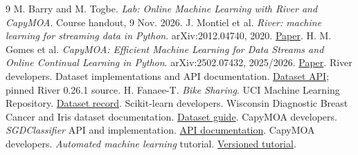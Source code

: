 \documentclass[10pt,a4paper]{article}
\begin{document}
\begin{minipage}[t]{.52\linewidth}\vspace{0pt}
\begin{thebibliography}{9}\fontsize{8.5}{10}\selectfont\setlength{\itemsep}{0pt}
 M. Barry and M. Togbe. \emph{Lab: Online Machine Learning with River and CapyMOA}. Course handout, 9 Nov. 2026.
 J. Montiel et al. \emph{River: machine learning for streaming data in Python}. arXiv:2012.04740, 2020. \href{https://arxiv.org/abs/2012.04740}{Paper}.
 H. M. Gomes et al. \emph{CapyMOA: Efficient Machine Learning for Data Streams and Online Continual Learning in Python}. arXiv:2502.07432, 2025/2026. \href{https://arxiv.org/abs/2502.07432}{Paper}.
 River developers. Dataset implementations and API documentation. \href{https://riverml.xyz/latest/api/datasets/Elec2/}{Dataset API}; pinned River 0.26.1 source.
 H. Fanaee-T. \emph{Bike Sharing}. UCI Machine Learning Repository. \href{https://archive.ics.uci.edu/dataset/275/bike+sharing+dataset}{Dataset record}.
 Scikit-learn developers. Wisconsin Diagnostic Breast Cancer and Iris dataset documentation. \href{https://scikit-learn.org/stable/datasets/toy_dataset.html}{Dataset guide}.
 CapyMOA developers. \emph{SGDClassifier} API and implementation. \href{https://capymoa.org/api/modules/capymoa.classifier.SGDClassifier.html}{API documentation}.
 CapyMOA developers. \emph{Automated machine learning} tutorial. \href{https://capymoa.org/v0.15.0/notebooks/automl/automl.html}{Versioned tutorial}.
\end{thebibliography}
\end{minipage}
\end{document}
